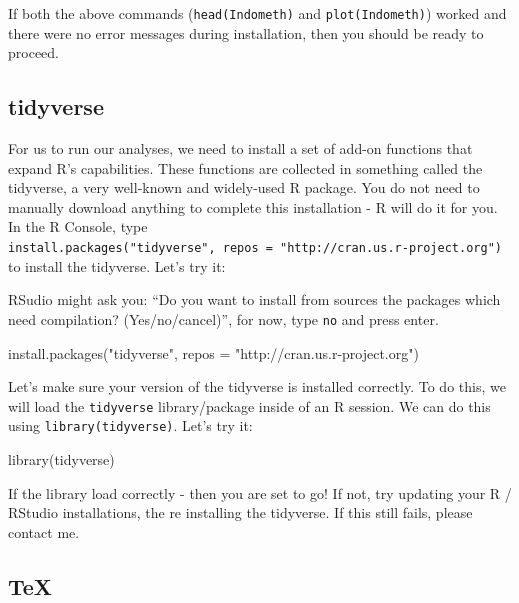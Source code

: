 \documentclass[
]{krantz}
\newenvironment{Shaded}{\begin{snugshade}}{\end{snugshade}}
\newcommand{\AttributeTok}[1]{\textcolor[rgb]{0.77,0.63,0.00}{#1}}
\newcommand{\FunctionTok}[1]{\textcolor[rgb]{0.00,0.00,0.00}{#1}}
\newcommand{\NormalTok}[1]{#1}
\newcommand{\StringTok}[1]{\textcolor[rgb]{0.31,0.60,0.02}{#1}}
\begin{document}
If both the above commands (\texttt{head(Indometh)} and \texttt{plot(Indometh)}) worked and there were no error messages during installation, then you should be ready to proceed.

\hypertarget{tidyverse}{%
\subsection{tidyverse}\label{tidyverse}}

For us to run our analyses, we need to install a set of add-on functions that expand R's capabilities. These functions are collected in something called the tidyverse, a very well-known and widely-used R package. You do not need to manually download anything to complete this installation - R will do it for you. In the R Console, type \texttt{install.packages("tidyverse",\ repos\ =\ "http://cran.us.r-project.org")} to install the tidyverse. Let's try it:

RSudio might ask you: ``Do you want to install from sources the packages which need compilation? (Yes/no/cancel)'', for now, type \texttt{no} and press enter.

\begin{Shaded}
\begin{Highlighting}[]
\FunctionTok{install.packages}\NormalTok{(}\StringTok{"tidyverse"}\NormalTok{, }\AttributeTok{repos =} \StringTok{"http://cran.us.r{-}project.org"}\NormalTok{)}
\end{Highlighting}
\end{Shaded}

Let's make sure your version of the tidyverse is installed correctly. To do this, we will load the \texttt{tidyverse} library/package inside of an R session. We can do this using \texttt{library(tidyverse)}. Let's try it:

\begin{Shaded}
\begin{Highlighting}[]
\FunctionTok{library}\NormalTok{(tidyverse)}
\end{Highlighting}
\end{Shaded}

If the library load correctly - then you are set to go! If not, try updating your R / RStudio installations, the re installing the tidyverse. If this still fails, please contact me.

\hypertarget{tex}{%
\subsection{TeX}\label{tex}}
\end{document}
